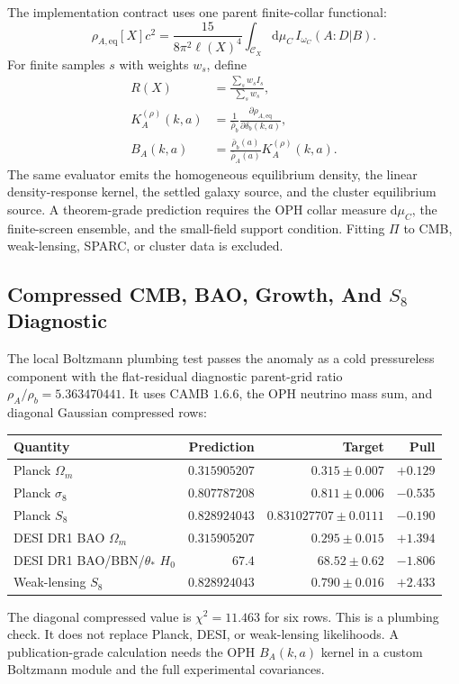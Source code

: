 \documentclass[11pt]{article}
\newcommand{\dd}{\mathrm{d}}
\begin{document}
The implementation contract uses one parent finite-collar functional:
\begin{equation}
  \rho_{A,\mathrm{eq}}[X]c^2
  =
  \frac{15}{8\pi^2\ell(X)^4}
  \int_{\mathcal C_X}\dd\mu_C\,
  I_{\omega_C}(A:D|B).
  \label{eq:parentfunctional}
\end{equation}
For finite samples \(s\) with weights \(w_s\), define
\begin{align}
  R(X)&=\frac{\sum_s w_s I_s}{\sum_s w_s},\\
  K_A^{(\rho)}(k,a)
  &=\frac{1}{\bar\rho_b}
    \frac{\partial \rho_{A,\mathrm{eq}}}{\partial \delta_b(k,a)},\\
  B_A(k,a)
  &=\frac{\bar\rho_b(a)}{\bar\rho_A(a)}K_A^{(\rho)}(k,a).
\end{align}
The same evaluator emits the homogeneous equilibrium density, the linear
density-response kernel, the settled galaxy source, and the cluster
equilibrium source.  A theorem-grade prediction requires the OPH collar
measure \(\dd\mu_C\), the finite-screen ensemble, and the small-field support
condition.  Fitting \(\Pi\) to CMB, weak-lensing, SPARC, or cluster data is
excluded.

\subsection{Compressed CMB, BAO, Growth, And \(S_8\) Diagnostic}

The local Boltzmann plumbing test passes the anomaly as a cold pressureless
component with the flat-residual diagnostic parent-grid ratio
\(\rho_A/\rho_b=5.363470441\).  It uses CAMB \(1.6.6\), the OPH neutrino mass
sum, and diagonal Gaussian compressed rows:
\begin{center}
\begin{tabular}{@{}lrrr@{}}
\toprule
Quantity & Prediction & Target & Pull \\
\midrule
Planck \(\Omega_m\) & \(0.315905207\) & \(0.315\pm0.007\) & \(+0.129\) \\
Planck \(\sigma_8\) & \(0.807787208\) & \(0.811\pm0.006\) & \(-0.535\) \\
Planck \(S_8\) & \(0.828924043\) & \(0.831027707\pm0.0111\) & \(-0.190\) \\
DESI DR1 BAO \(\Omega_m\) & \(0.315905207\) & \(0.295\pm0.015\) & \(+1.394\) \\
DESI DR1 BAO/BBN/\(\theta_\ast\) \(H_0\) & \(67.4\) & \(68.52\pm0.62\) & \(-1.806\) \\
Weak-lensing \(S_8\) & \(0.828924043\) & \(0.790\pm0.016\) & \(+2.433\) \\
\bottomrule
\end{tabular}
\end{center}
The diagonal compressed value is \(\chi^2=11.463\) for six rows.  This is a
plumbing check.  It does not replace Planck, DESI, or weak-lensing likelihoods.
A publication-grade calculation needs the OPH \(B_A(k,a)\) kernel in a custom
Boltzmann module and the full experimental covariances.
\end{document}
